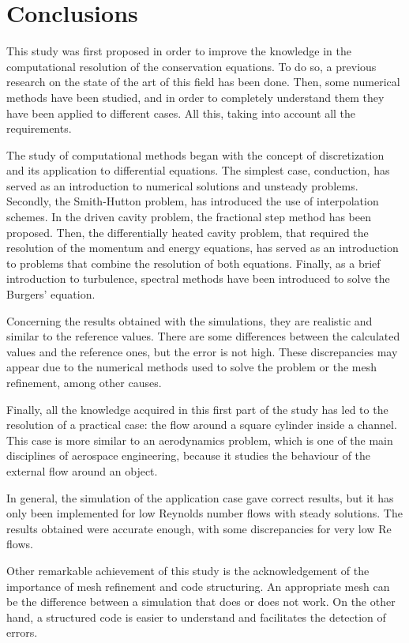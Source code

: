 \chapter{Conclusions}
This study was first proposed in order to improve the knowledge in the computational resolution of the conservation equations. To do so, a previous research on the state of the art of this field has been done. Then, some numerical methods have been studied, and in order to completely understand them they have been applied to different cases. All this, taking into account all the requirements.

The study of computational methods began with the concept of discretization and its application to differential equations. The simplest case, conduction, has served as an introduction to numerical solutions and unsteady problems. Secondly, the Smith-Hutton problem, has introduced the use of interpolation schemes. In the driven cavity problem, the fractional step method has been proposed. Then, the differentially heated cavity problem, that required the resolution of the momentum and energy equations, has served as an introduction to problems that combine the resolution of both equations. Finally, as a brief introduction to turbulence, spectral methods have been introduced to solve the Burgers' equation.

Concerning the results obtained with the simulations, they are realistic and similar to the reference values. There are some differences between the calculated values and the reference ones, but the error is not high. These discrepancies may appear due to the numerical methods used to solve the problem or the mesh refinement, among other causes.

Finally, all the knowledge acquired in this first part of the study has led to the resolution of a practical case: the flow around a square cylinder inside a channel. This case is more similar to an aerodynamics problem, which is one of the main disciplines of aerospace engineering, because it studies the behaviour of the external flow around an object.

In general, the simulation of the application case gave correct results, but it has only been implemented for low Reynolds number flows with steady solutions. The results obtained were accurate enough, with some discrepancies for very low Re flows.

Other remarkable achievement of this study is the acknowledgement of the importance of mesh refinement and code structuring. An appropriate mesh can be the difference between a simulation that does or does not work. On the other hand, a structured code is easier to understand and facilitates the detection of errors.


